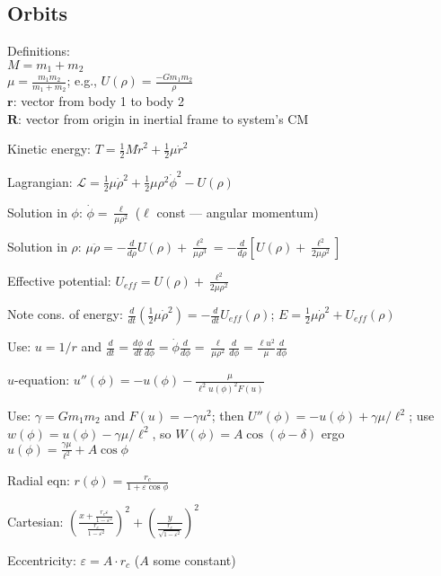 \documentclass[letterpaper,landscape,10pt]{article}
\newenvironment{mydescription}
{\begin{description}
	\setlength{\itemsep}{0pt}
	\setlength{\parskip}{0pt}
	\setlength{\parsep}{-1pt}}
{\end{description}}
\begin{document}
{\begin{multicols}{3}
	\subsection*{Orbits}
		\begin{mydescription}
		  \item[Definitions:] \ \\
			$M=m_1+m_2$ \\
			$\mu=\frac{m_1m_2}{m_1+m_2}$; e.g., $U(\rho)=\frac{-Gm_1m_2}{\rho}$ \\
			$\bm{r}$: vector from body 1 to body 2 \\
			$\bm{R}$: vector from origin in inertial frame to system's CM
		  \item[Kinetic energy:] $T=\frac{1}{2}M\dot{r}^2+\frac{1}{2}\mu\dot{r}^2$
		  \item[Lagrangian:] $\mathscr{L}=\frac{1}{2}\mu\dot{\rho}^2+\frac{1}{2}\mu{\rho}^2\dot{\phi}^2-U(\rho)$
		  \item[Solution in $\phi$:] $\dot\phi=\frac{\ell}{\mu\rho^2}$ ($\ell$ const --- angular momentum)
		  \item[Solution in $\rho$:] $\mu\ddot{\rho}=-\frac{d}{d\rho}U(\rho) + \frac{\ell^2}{\mu\rho^3} = -\frac{d}{d\rho}\left[U(\rho)+\frac{\ell^2}{2\mu\rho^2}\right]$
		  \item[Effective potential:]$U_{eff}=U(\rho)+\frac{\ell^2}{2\mu\rho^2}$
		  \item[Note cons. of energy:] $\frac{d}{dt}\left( \frac{1}{2}\mu\dot\rho^2 \right) = -\frac{d}{dt}U_{eff}(\rho)$; $E=\frac{1}{2}\mu\dot\rho^2+U_{eff}(\rho)$
		  \item[Use:]$u=1/r$ and $\frac{d}{dt}=\frac{d\phi}{dt}\frac{d}{d\phi}=\dot\phi\frac{d}{d\phi}=\frac{\ell}{\mu\rho^2}\frac{d}{d\phi}=\frac{\ell u^2}{\mu}\frac{d}{d\phi}$
		  \item[$u$-equation:]$u''(\phi)=-u(\phi)-\frac{\mu}{\ell^2u(\phi)^2F(u)}$
		  \item[Use:]$\gamma=Gm_1m_2$ and $F(u)=-\gamma u^2$; then $U''(\phi)=-u(\phi)+\gamma\mu/\ell^2$; use $w(\phi)=u(\phi)-\gamma\mu/\ell^2$, so $W(\phi)=A\cos(\phi-\delta)$ ergo $u(\phi)=\frac{\gamma\mu}{\ell^2}+A\cos\phi$
		  \item[Radial eqn:] $r(\phi)=\frac{r_c}{1+\varepsilon\cos\phi}$
		  \item[Cartesian:] $\left( \frac{x+\frac{r_c\varepsilon}{1-\varepsilon^2}}{\frac{r_c}{1-\varepsilon^2}} \right)^2+\left( \frac{y}{\frac{r_c}{\sqrt{1-\varepsilon^2}}} \right)^2$
		  \item[Eccentricity:] $\varepsilon=A\cdot r_c$ ($A$ some constant)

\end{mydescription}
\end{multicols}}
\end{document}
